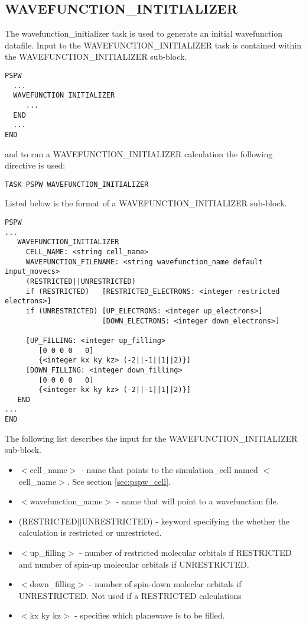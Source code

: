 \subsection{WAVEFUNCTION\_INTITIALIZER}
The wavefunction\_initializer task is used to generate an initial wavefunction
datafile.
Input to the WAVEFUNCTION\_INITIALIZER task is contained
within the WAVEFUNCTION\_INITIALIZER sub-block.
\begin{verbatim}
PSPW
  ...
  WAVEFUNCTION_INITIALIZER
     ...
  END
  ...
END
\end{verbatim}
and to run a WAVEFUNCTION\_INITIALIZER calculation the following directive 
is used:
\begin{verbatim}
TASK PSPW WAVEFUNCTION_INITIALIZER
\end{verbatim}
Listed below is the format of a WAVEFUNCTION\_INITIALIZER sub-block.
\begin{verbatim}
PSPW
... 
   WAVEFUNCTION_INITIALIZER
     CELL_NAME: <string cell_name>
     WAVEFUNCTION_FILENAME: <string wavefunction_name default input_movecs>
     (RESTRICTED||UNRESTRICTED)
     if (RESTRICTED)   [RESTRICTED_ELECTRONS: <integer restricted electrons>]
     if (UNRESTRICTED) [UP_ELECTRONS: <integer up_electrons>]
                       [DOWN_ELECTRONS: <integer down_electrons>]
     
     [UP_FILLING: <integer up_filling>
        [0 0 0 0   0]
        {<integer kx ky kz> (-2||-1||1||2)}]
     [DOWN_FILLING: <integer down_filling>
        [0 0 0 0   0]
        {<integer kx ky kz> (-2||-1||1||2)}]
   END
...
END
\end{verbatim}
The following list describes the input for the WAVEFUNCTION\_INITIALIZER
sub-block.
\begin{itemize}
	\item $<$cell\_name$>$ - name that points 
		to the simulation\_cell named $<$cell\_name$>$.  See section \ref{sec:pspw_cell}.
	\item $<$wavefunction\_name$>$ - name that will point
              to a wavefunction file.
	\item (RESTRICTED$||$UNRESTRICTED) - keyword specifying the whether
              the calculation is restricted or unrestricted.
	\item $<$up\_filling$>$ - number of restricted molecular orbitals if
              RESTRICTED and number of spin-up molecular orbitals if 
              UNRESTRICTED.
        \item $<$down\_filling$>$ - number of spin-down moleclar orbitals if
              UNRESTRICTED.  Not used if a RESTRICTED calculations
        \item $<$kx ky kz$>$ - specifies which planewave is to be filled. 
\end{itemize}



